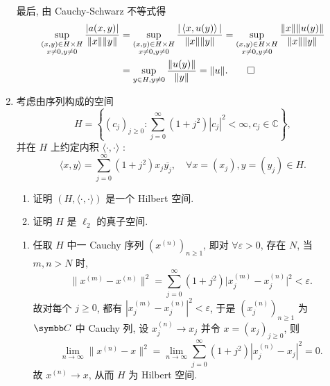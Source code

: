 \begin{enumerate}
\begin{answer}
      最后, 由 Cauchy-Schwarz 不等式得
      \begin{align*}
          \sup_{\substack{(x,y)\in H\times H \\ x\neq 0,y\neq 0}}\frac{|a(x,y)|}{\|x\|\|y\|}
          & =\sup_{\substack{(x,y)\in H\times H \\ x\neq 0,y\neq 0}}\frac{|\left\langle x,u(y)\right\rangle|}{\|x\|\|y\|}=\sup_{\substack{(x,y)\in H\times H \\ x\neq 0,y\neq 0}}\frac{\|x\|\|u(y)\|}{\|x\|\|y\|} \\
          & =\sup_{y\in H,y\neq 0}\frac{\|u(y)\|}{\|y\|}=\|u\|.\qedhere
      \end{align*}
    \end{answer}
  \item 考虑由序列构成的空间
  \[
  H=\left\{\left(c_{j}\right)_{j \geq 0}: \sum_{j=0}^{\infty}\left(1+j^{2}\right)\left|c_{j}\right|^{2}<\infty, c_{j} \in \mathbb{C}\right\},
  \]
  并在 $H$ 上约定内积 $\langle\cdot, \cdot\rangle$ :
  \[
  \langle x, y\rangle=\sum_{j=0}^{\infty}\left(1+j^{2}\right) x_{j} \overline{y_{j}}, \quad \forall x=\left(x_{j}\right), y=\left(y_{j}\right) \in H .
  \]
    \begin{enumerate}
      \item 证明 $(H,\langle\cdot, \cdot\rangle)$ 是一个 Hilbert 空间.
      \item 证明 $H$ 是 $\ell_{2}$ 的真子空间.
    \end{enumerate}
    \begin{answer}
      \begin{enumerate}
        \item 任取 $H$ 中一 Cauchy 序列 $(x^{(n)})_{n\geq 1}$, 即对 $\forall\varepsilon>0$,
        存在 $N$, 当 $m,n>N$ 时,
        \[\|x^{(m)}-x^{(n)}\|^2=\sum_{j=0}^{\infty}(1+j^2)\bigl|x^{(m)}_j-x^{(n)}_j\bigr|^2<\varepsilon.\]
        故对每个 $j\geq 0$, 都有 $|x^{(m)}_j-x^{(n)}_j|^2<\varepsilon$, 于是 $(x^{(n)}_j)_{n\geq 1}$
        为 $\C$ 中 Cauchy 列, 设 $x^{(n)}_j\to x_j$ 并令 $x=(x_j)_{j\geq 0}$, 则
        \[\lim_{n\to\infty}\|x^{(n)}-x\|^2=\lim_{n\to\infty}\sum_{j=0}^{\infty}(1+j^2)|x^{(n)}_j-x_j|^2=0.\]
        故 $x^{(n)}\to x$, 从而 $H$ 为 Hilbert 空间.
    

\end{enumerate}
\end{answer}
\end{enumerate}
